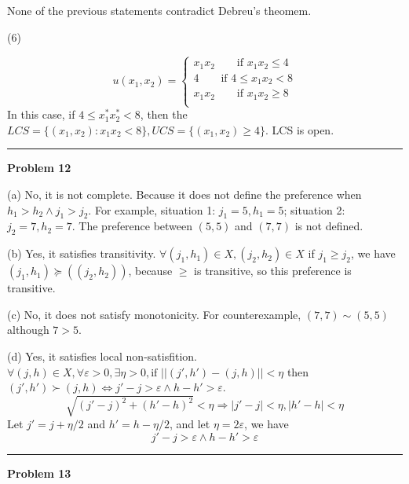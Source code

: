 \documentclass[letterpaper, 11pt]{article}
\newcommand{\1}{\mathds{1}}	%
\theoremstyle{definition}
\begin{document}
None of the previous statements contradict Debreu's theomem.

(6)

\[
    u(x_1,x_2) = \left\{\begin{array}{l}
        x_1x_2 \qquad \text{if } x_1x_2 \leq 4  \\
        4  \qquad \text{if } 4 \leq x_1x_2 < 8  \\
        x_1x_2 \qquad \text{if } x_1x_2  \geq 8 \\
    \end{array}\right.
\]
In this case, if $4 \leq x_1^*x_2^* < 8$, then the $LCS = \{(x_1, x_2): x_1x_2 < 8\}, UCS = \{(x_1,x_2) \geq 4\}$. LCS is open.

\bigskip
\hrule
\bigskip

\textbf{Problem 12}

(a) No, it is not complete. Because it does not define the preference when $h_1 > h_2 \wedge j_1 > j_2$. For example, situation 1: $j_1 = 5, h_1 = 5$; situation 2: $j_2 = 7, h_2 = 7$. The preference between $(5,5)$ and $(7,7)$ is not defined.

(b) Yes, it satisfies transitivity. $\forall (j_1,h_1) \in X, (j_2,h_2) \in X$ if $j_1 \geq j_2$, we have $(j_1,h_1) \succeq ((j_2,h_2))$, because $\geq $ is transitive, so this preference is transitive.

(c) No, it does not satisfy monotonicity. For counterexample, $(7,7) \sim (5,5)$ although $7>5$.

(d) Yes, it satisfies local non-satisfition. $\forall (j, h) \in X, \forall \varepsilon > 0, \exists \eta > 0,  \text{if } ||(j',h') - (j,h)|| < \eta$ then $(j',h') \succ (j,h) \iff j' - j > \varepsilon  \wedge h - h' > \varepsilon$. \[
    \sqrt{(j'-j)^{2} + (h'-h)^{2}} < \eta \Longrightarrow \left| j' -j \right| < \eta , \left| h'-h \right| < \eta
\]
Let $j' = j + \eta/2$ and $h'= h - \eta / 2 $, and let $\eta = 2\varepsilon$, we have \[
    j' - j > \varepsilon  \wedge h - h' > \varepsilon
\]

\bigskip
\hrule
\bigskip

\textbf{Problem 13}
\end{document}
